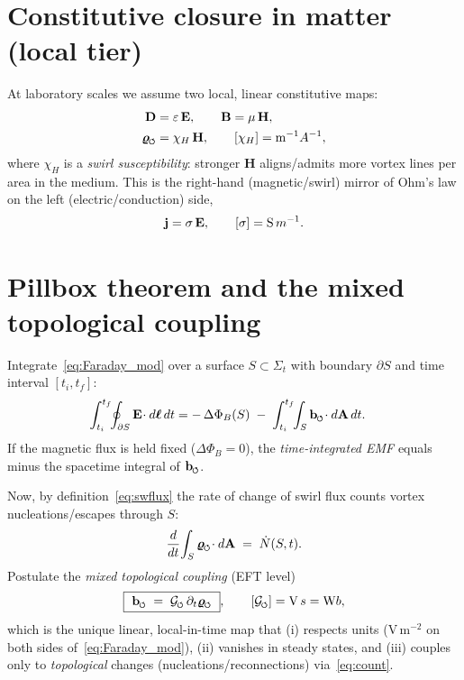 \documentclass[reprint,aps,onecolumn,nofootinbib]{revtex4-2}
\newcommand{\swirlarrow}{%
	\mathchoice{\mkern-2mu\scriptstyle\boldsymbol{\circlearrowleft}}%
	{\mkern-2mu\scriptstyle\boldsymbol{\circlearrowleft}}%
	{\mkern-2mu\scriptscriptstyle\boldsymbol{\circlearrowleft}}%
	{\mkern-2mu\scriptscriptstyle\boldsymbol{\circlearrowleft}}%
}
\begin{document}
\section{Constitutive closure in matter (local tier)}
At laboratory scales we assume two local, linear constitutive maps:
\begin{align}
\mathbf D &= \varepsilon\,\mathbf E, \qquad \mathbf B = \mu\,\mathbf H, \\
\bm{\varrho}_{\swirlarrow} &= \chi_H \,\mathbf H, \qquad [\chi_H] = {\textrm m^{-1}A^{-1}},
\label{eq:local_const}
\end{align}
where $\chi_H$ is a \emph{swirl susceptibility}: stronger $\mathbf H$ aligns/admits more vortex lines per area in the medium. This is the right-hand (magnetic/swirl) mirror of Ohm’s law on the left (electric/conduction) side,
\begin{equation}
\mathbf j = \sigma\,\mathbf E,
\qquad [\sigma]={\textrm S\,m^{-1}}.
\end{equation}

\section{Pillbox theorem and the mixed topological coupling}
Integrate~\eqref{eq:Faraday_mod} over a surface $S\subset \Sigma_t$ with boundary $\partial S$ and time interval $[t_i,t_f]$:
\begin{align}
\int_{t_i}^{t_f}\!\!\oint_{\partial S}\mathbf E\!\cdot d\boldsymbol\ell\,dt
&= -\,\Delta\Phi_B(S) \;-\; \int_{t_i}^{t_f}\!\!\int_S \mathbf b_{\swirlarrow}\!\cdot d\mathbf A\,dt.
\label{eq:pillbox1}
\end{align}
If the magnetic flux is held fixed ($\Delta\Phi_B=0$), the \emph{time-integrated EMF} equals minus the spacetime integral of $\mathbf b_{\swirlarrow}$.

Now, by definition~\eqref{eq:swflux} the rate of change of swirl flux counts vortex nucleations/escapes through $S$:
\begin{equation}
\frac{d}{dt}\!\int_S \bm{\varrho}_{\swirlarrow}\!\cdot d\mathbf A \;=\; \dot N(S,t).
\label{eq:count}
\end{equation}
Postulate the \emph{mixed topological coupling} (EFT level)
\begin{equation}
\boxed{\ \mathbf b_{\swirlarrow} \;=\; \mathcal G_{\swirlarrow}\,\partial_t\bm{\varrho}_{\swirlarrow}\ },
\qquad [\mathcal G_{\swirlarrow}]={\textrm V\,s}= {\textrm Wb},
\label{eq:mix}
\end{equation}
which is the unique linear, local-in-time map that (i) respects units ($\mathrm{V\,m^{-2}}$ on both sides of~\eqref{eq:Faraday_mod}), (ii) vanishes in steady states, and (iii) couples only to \emph{topological} changes (nucleations/reconnections) via~\eqref{eq:count}.
\end{document}

